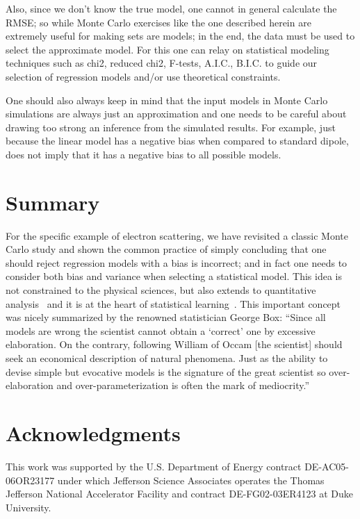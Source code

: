 \documentclass[10pt,aps,prc,twocolumn]{revtex4-1}
\begin{document}
Also, since we don't know the true model, one cannot in general calculate the RMSE; so while Monte Carlo exercises 
like the one described herein are extremely useful for making sets are models; in the end, the data must be used 
to select the approximate model. 
For this one can relay on statistical modeling techniques such as chi2, reduced chi2, F-tests, A.I.C., B.I.C. 
to guide our selection of regression models and/or use theoretical constraints.

One should also always keep in mind that the input models in Monte Carlo simulations are always just an approximation
and one needs to be careful about drawing too strong an inference from the simulated results. 
For example, just because the linear model has a negative bias when compared to standard dipole, 
does not imply that it has a negative bias to all possible models.


\section{Summary}

For the specific example of electron scattering, we have revisited a classic Monte Carlo study and shown
the common practice of simply concluding that one should reject regression models with a bias is incorrect; 
and in fact one needs to consider both bias and variance when selecting a statistical model.   
This idea is not constrained to the physical sciences, but also extends 
to quantitative analysis~\cite{Brighton:2015} and it is at the heart of statistical 
learning~\cite{Hastie:2009}.
This important concept was nicely summarized by the renowned statistician George Box: ``Since all models 
are wrong the scientist cannot obtain a `correct' one
by excessive elaboration.  On the contrary, following William of Occam 
[the scientist] should seek an economical description of natural phenomena. 
Just as the ability to devise simple but evocative models is the signature of the
great scientist so over-elaboration and over-parameterization is often
the mark of mediocrity.''~\cite{Box76}


\section{Acknowledgments}

This work was supported by the U.S.  Department of Energy contract DE-AC05-06OR23177
under which Jefferson Science Associates operates the Thomas Jefferson National 
Accelerator Facility and contract DE-FG02-03ER4123 at Duke University.


\end{document}
